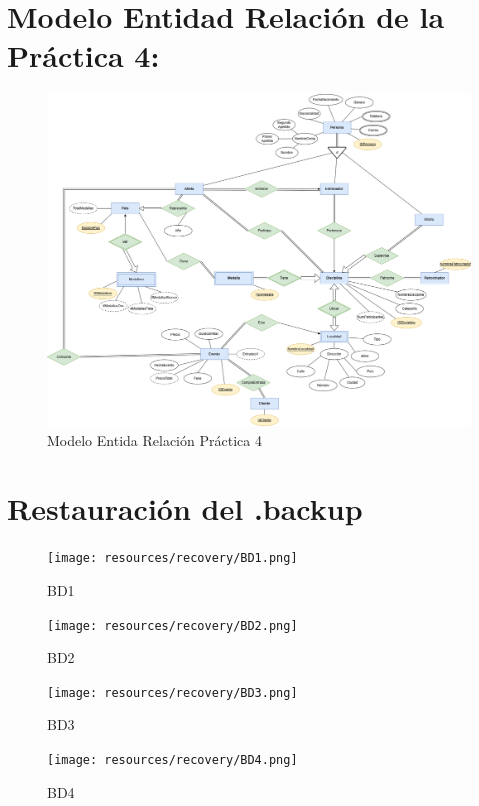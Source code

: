 \section{Modelo Entidad Relación de la Práctica 4:}
\begin{figure}[h]
    \centering
    \includegraphics[width=1.1\textwidth]{resources/ModeloEntidad_Relación.png}
    \caption{Modelo Entida Relación Práctica 4}
\end{figure}

\clearpage

\section{Restauración del .backup}
\begin{figure}[h]
    \centering
    \texttt{[image: resources/recovery/BD1.png]}
    \caption{BD1}
\end{figure}

\begin{figure}[h]
    \centering
    \texttt{[image: resources/recovery/BD2.png]}
    \caption{BD2}
\end{figure}

\begin{figure}[h]
    \centering
    \texttt{[image: resources/recovery/BD3.png]}
    \caption{BD3}
\end{figure}

\begin{figure}[h]
    \centering
    \texttt{[image: resources/recovery/BD4.png]}
    \caption{BD4}
\end{figure}

